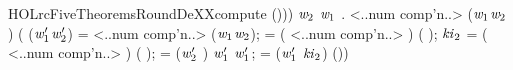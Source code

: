 \begin{SaveVerbatim}{HOLrcFiveTheoremsRoundDeXXcompute}
         (\HOLSymConst{,}))) \HOLSymConst{\HOLTokenConj{}}
   \HOLSymConst{\HOLTokenForall{}}\ensuremath{\HOLBoundVar{w}\sb{\mathrm{2}}} \ensuremath{\HOLBoundVar{w}\sb{\mathrm{1}}}  .
      <..num comp'n..>  (\ensuremath{\HOLBoundVar{w}\sb{\mathrm{1}}}\HOLSymConst{,}\ensuremath{\HOLBoundVar{w}\sb{\mathrm{2}}}) \HOLSymConst{=}
     (
        (\ensuremath{\HOLBoundVar{w}\sb{\mathrm{1}}\sp{\prime{}}}\HOLSymConst{,}\ensuremath{\HOLBoundVar{w}\sb{\mathrm{2}}\sp{\prime{}}}) =  <..num comp'n..>  (\ensuremath{\HOLBoundVar{w}\sb{\mathrm{1}}}\HOLSymConst{,}\ensuremath{\HOLBoundVar{w}\sb{\mathrm{2}}});
         =  ( \HOLSymConst{\HOLTokenProd{}} <..num comp'n..> \HOLSymConst{\ensuremath{-}} ) ( );
        \ensuremath{\HOLBoundVar{ki}\sb{\mathrm{2}}} =  ( \HOLSymConst{\HOLTokenProd{}} <..num comp'n..> \HOLSymConst{\ensuremath{-}} ) ( );
         = (\ensuremath{\HOLBoundVar{w}\sb{\mathrm{2}}\sp{\prime{}}} \HOLSymConst{\ensuremath{-}} ) \HOLSymConst{\HOLTokenRor{}}  \ensuremath{\HOLBoundVar{w}\sb{\mathrm{1}}\sp{\prime{}}} \HOLSymConst{\HOLTokenEor{}} \ensuremath{\HOLBoundVar{w}\sb{\mathrm{1}}\sp{\prime{}}};
         = (\ensuremath{\HOLBoundVar{w}\sb{\mathrm{1}}\sp{\prime{}}} \HOLSymConst{\ensuremath{-}} \ensuremath{\HOLBoundVar{ki}\sb{\mathrm{2}}}) \HOLSymConst{\HOLTokenRor{}}   \HOLSymConst{\HOLTokenEor{}} 
        (\HOLSymConst{,}))
\end{SaveVerbatim}
\newcommand{\HOLrcFiveTheoremsRoundDeXXcompute}{\UseVerbatim{HOLrcFiveTheoremsRoundDeXXcompute}}
